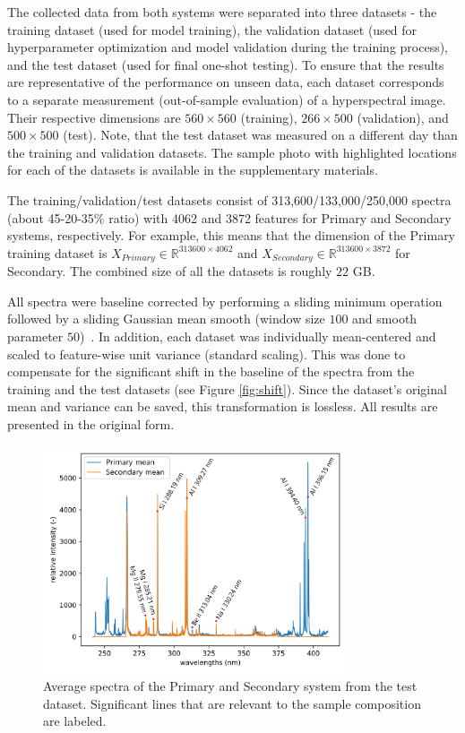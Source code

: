 \documentclass[preprint,11pt]{elsarticle}
\begin{document}
The collected data from both systems were separated into three datasets - the training dataset (used for model training), the validation dataset (used for hyperparameter optimization and model validation during the training process), and the test dataset (used for final one-shot testing). To ensure that the results are representative of the performance on unseen data, each dataset corresponds to a separate measurement (out-of-sample evaluation) of a hyperspectral image. Their respective dimensions are $560 \times 560$ (training), $266 \times 500$ (validation), and $500 \times 500$ (test). Note, that the test dataset was measured on a different day than the training and validation datasets. The sample photo with highlighted locations for each of the datasets is available in the supplementary materials. 

The training/validation/test datasets consist of 313,600/133,000/250,000 spectra (about 45-20-35\% ratio) with 4062 and 3872 features for Primary and Secondary systems, respectively. For example, this means that the dimension of the Primary training dataset is $X_{Primary} \in \mathbb{R}^{313600 \times 4062}$ and $X_{Secondary} \in \mathbb{R}^{313600 \times 3872}$ for Secondary. The combined size of all the datasets is roughly $22$ GB.

All spectra were baseline corrected by performing a sliding minimum operation followed by a sliding Gaussian mean smooth (window size $100$ and smooth parameter $50$)~\cite{kepevs2018influence}. In addition, each dataset was individually mean-centered and scaled to feature-wise unit variance (standard scaling). This was done to compensate for the significant shift in the baseline of the spectra from the training and the test datasets (see Figure \ref{fig:shift}). Since the dataset's original mean and variance can be saved, this transformation is lossless. All results are presented in the original form.

\begin{figure}[!htb]
    \centering
    \includegraphics[width=0.8\textwidth]{s1_vs_s2_mean.png}
    \caption{Average spectra of the Primary and Secondary system from the test dataset. Significant lines that are relevant to the sample composition are labeled.}
    \label{fig:means}
\end{figure}
\end{document}
